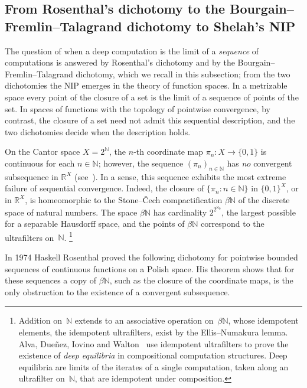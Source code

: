 \documentclass[psamsfonts]{amsart}
\theoremstyle{definition}
\theoremstyle{remark}
\numberwithin{equation}{section}
\begin{document}
\subsection{From Rosenthal’s dichotomy to the Bourgain--Fremlin--Talagrand dichotomy to Shelah’s NIP}

The question of when a deep computation is the limit of a \emph{sequence} of computations is answered by Rosenthal's dichotomy and by the Bourgain--Fremlin--Talagrand dichotomy, which we recall in this subsection;
from the two dichotomies the NIP emerges in the theory of function spaces.
In a metrizable space every point of the closure of a set is the limit of a sequence of points of the set.
In spaces of functions with the topology of pointwise convergence, by contrast, the closure of a set need not admit this sequential description, and the two dichotomies decide when the description holds.

On the Cantor space $X=2^\mathbb{N}$, the $n$-th coordinate map $\pi_n\colon X\to\{0,1\}$ is continuous for each $n\in \mathbb{N}$;
however, the sequence $(\pi_n)_{n\in\mathbb{N}}$ has \emph{no} convergent subsequence in $\mathbb{R}^X$ (see~\cite[Chapter~1.1]{Todorcevic_1997_TopicsTop}).
In a sense, this sequence exhibits the most extreme failure of sequential convergence.
Indeed, the closure of $\{\pi_n:n\in\mathbb{N}\}$ in $\{0, 1\}^X$, or in $\mathbb{R}^X$, is homeomorphic to the Stone--Čech compactification $\beta\mathbb{N}$ of the discrete space of natural numbers.
The space $\beta \mathbb{N}$ has cardinality $2^{2^{\aleph_0}}$, the largest possible for a separable Hausdorff space, and the points of $\beta\mathbb{N}$ correspond to the ultrafilters on~$\mathbb{N}$.%
\footnote{\label{fn:id-ufilters}Addition on~$\mathbb{N}$ extends to an associative operation on~$\beta\mathbb{N}$, whose idempotent elements, the idempotent ultrafilters, exist by the Ellis--Numakura lemma.
Alva, Dueñez, Iovino and Walton~\cite{alva2024approximability} use idempotent ultrafilters to prove the existence of \emph{deep equilibria} in compositional computation structures.
Deep equilibria are limits of the iterates of a single computation, taken along an ultrafilter on~$\mathbb{N}$, that are idempotent under composition.}

In 1974 Haskell Rosenthal proved the following dichotomy for pointwise bounded sequences of continuous functions on a Polish space.
His theorem shows that for these sequences a copy of $\beta\mathbb{N}$, such as the closure of the coordinate maps, is the only obstruction to the existence of a convergent subsequence.
\end{document}
